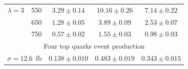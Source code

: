 \begin{table}[p]
\begin{center}
\begin{tabular}{c|c|c|c|c}
      $\lambda=3$ & 550 & $3.29 \pm 0.14$ & $10.16  \pm 0.26$ & $7.14  \pm 0.22$ \\
      & 650 & $1.28 \pm 0.05$ & $3.89  \pm 0.09$ & $2.53  \pm 0.07$ \\
      & 750 & $0.57 \pm 0.02$ & $1.55  \pm 0.03$ & $0.98  \pm 0.03$ \\
      \hline
      \multicolumn{5}{c}{Four top quarks event production} \\
      \hline
      \multicolumn{2}{c|}{$\sigma=12.6$~fb} & $0.138 \pm 0.010$ & $0.483\pm 0.019$& $0.343\pm 0.015$\\
      \hline
    \end{tabular}
  \end{center}
\end{table}



